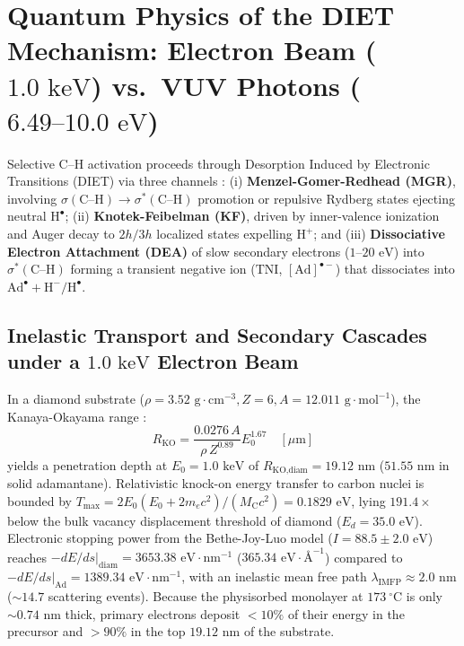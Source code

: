 \documentclass[10pt,twocolumn,a4paper]{article}
\begin{document}
\section{Quantum Physics of the DIET Mechanism: Electron Beam ($1.0\text{ keV}$) vs.\ VUV Photons ($6.49\text{--}10.0\text{ eV}$)}

Selective $\text{C--H}$ activation proceeds through Desorption Induced by Electronic Transitions (DIET) via three channels \cite{Menzel1964,Avouris1989}: (i) \textbf{Menzel-Gomer-Redhead (MGR)}, involving $\sigma(\text{C--H}) \to \sigma^*(\text{C--H})$ promotion or repulsive Rydberg states ejecting neutral $\text{H}^\bullet$; (ii) \textbf{Knotek-Feibelman (KF)}, driven by inner-valence ionization and Auger decay to $2h/3h$ localized states expelling $\text{H}^+$; and (iii) \textbf{Dissociative Electron Attachment (DEA)} of slow secondary electrons ($1\text{--}20\text{ eV}$) into $\sigma^*(\text{C--H})$ forming a transient negative ion ($\text{TNI}$, $[\text{Ad}]^{\bullet-}$) that dissociates into $\text{Ad}^\bullet + \text{H}^-/\text{H}^\bullet$.

\subsection{Inelastic Transport and Secondary Cascades under a $1.0\text{ keV}$ Electron Beam}
In a diamond substrate ($\rho = 3.52\text{ g}\cdot\text{cm}^{-3}, Z=6, A=12.011\text{ g}\cdot\text{mol}^{-1}$), the Kanaya-Okayama range \cite{Kanaya1972}:
\begin{equation}
R_{\text{KO}} = \frac{0.0276\,A}{\rho\,Z^{0.89}} E_0^{1.67}\quad [\mu\text{m}]
\end{equation}
yields a penetration depth at $E_0 = 1.0\text{ keV}$ of $R_{\text{KO,diam}} = 19.12\text{ nm}$ ($51.55\text{ nm}$ in solid adamantane). Relativistic knock-on energy transfer to carbon nuclei is bounded by $T_{\text{max}} = 2 E_0 (E_0 + 2 m_e c^2)/(M_{\text{C}} c^2) = 0.1829\text{ eV}$, lying $191.4\times$ below the bulk vacancy displacement threshold of diamond ($E_d = 35.0\text{ eV}$). Electronic stopping power from the Bethe-Joy-Luo model ($I = 88.5 \pm 2.0\text{ eV}$) reaches $-\left.dE/ds\right|_{\text{diam}} = 3653.38\text{ eV}\cdot\text{nm}^{-1}$ ($365.34\text{ eV}\cdot\text{\AA}^{-1}$) compared to $-\left.dE/ds\right|_{\text{Ad}} = 1389.34\text{ eV}\cdot\text{nm}^{-1}$, with an inelastic mean free path $\lambda_{\text{IMFP}} \approx 2.0\text{ nm}$ ($\sim 14.7$ scattering events). Because the physisorbed monolayer at $173\ ^\circ\text{C}$ is only $\sim 0.74\text{ nm}$ thick, primary electrons deposit $<10\%$ of their energy in the precursor and $>90\%$ in the top $19.12\text{ nm}$ of the substrate.
\end{document}
